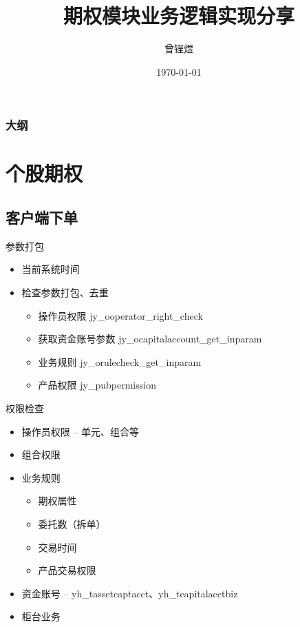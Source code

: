 \documentclass[12pt]{ctexbeamer}	%
\title[期权知识分享]{期权模块业务逻辑实现分享}	%
\author[Zengyu Zeng]{曾锃煜}
\institute[Hundsun]{资管，研发四部}	%
\date{\today}
\begin{document}
\begin{frame}
\titlepage
\end{frame}


\begin{frame}
\frametitle{大纲}
\tableofcontents
\end{frame}


\section{个股期权}


\subsection{客户端下单}

\begin{frame}{参数打包}
  \begin{itemize} %
    \item 当前系统时间
    \item 检查参数打包、去重
    \begin{itemize}
      \item 操作员权限 jy\_ooperator\_right\_check
      \item 获取资金账号参数 jy\_ocapitalaccount\_get\_inparam
      \item 业务规则 jy\_orulecheck\_get\_inparam
      \item 产品权限 jy\_pubpermission
    \end{itemize}
  \end{itemize}
\end{frame}

\begin{frame}{权限检查}
  \begin{itemize}
    \item 操作员权限 -- 单元、组合等
    \item 组合权限
    \item 业务规则
    \begin{itemize}
      \item 期权属性
      \item 委托数（拆单）
      \item 交易时间
      \item 产品交易权限
    \end{itemize}
    \item 资金账号 -- yh\_tassetcaptacct、yh\_tcapitalacctbiz
    \item 柜台业务
  \end{itemize}
\end{frame}
\end{document}
